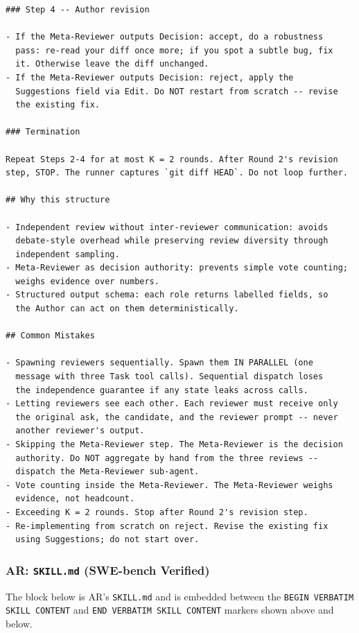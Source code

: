 \documentclass{article}
\begin{document}
\begin{footnotesize}
\begin{verbatim}
### Step 4 -- Author revision

- If the Meta-Reviewer outputs Decision: accept, do a robustness
  pass: re-read your diff once more; if you spot a subtle bug, fix
  it. Otherwise leave the diff unchanged.
- If the Meta-Reviewer outputs Decision: reject, apply the
  Suggestions field via Edit. Do NOT restart from scratch -- revise
  the existing fix.

### Termination

Repeat Steps 2-4 for at most K = 2 rounds. After Round 2's revision
step, STOP. The runner captures `git diff HEAD`. Do not loop further.

## Why this structure

- Independent review without inter-reviewer communication: avoids
  debate-style overhead while preserving review diversity through
  independent sampling.
- Meta-Reviewer as decision authority: prevents simple vote counting;
  weighs evidence over numbers.
- Structured output schema: each role returns labelled fields, so
  the Author can act on them deterministically.

## Common Mistakes

- Spawning reviewers sequentially. Spawn them IN PARALLEL (one
  message with three Task tool calls). Sequential dispatch loses
  the independence guarantee if any state leaks across calls.
- Letting reviewers see each other. Each reviewer must receive only
  the original ask, the candidate, and the reviewer prompt -- never
  another reviewer's output.
- Skipping the Meta-Reviewer step. The Meta-Reviewer is the decision
  authority. Do NOT aggregate by hand from the three reviews --
  dispatch the Meta-Reviewer sub-agent.
- Vote counting inside the Meta-Reviewer. The Meta-Reviewer weighs
  evidence, not headcount.
- Exceeding K = 2 rounds. Stop after Round 2's revision step.
- Re-implementing from scratch on reject. Revise the existing fix
  using Suggestions; do not start over.
\end{verbatim}
\end{footnotesize}

\subsubsection{AR: \texttt{SKILL.md} (SWE-bench Verified)}
\label{app:prompts-swebench-ar-body}

The block below is AR's \texttt{SKILL.md}
and is embedded between the
\texttt{BEGIN VERBATIM SKILL CONTENT} and \texttt{END VERBATIM SKILL
CONTENT} markers shown above and below.
\end{document}
